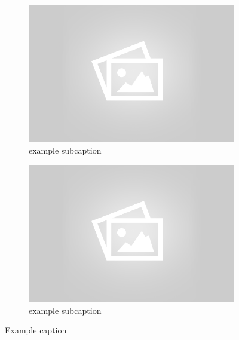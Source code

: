 \begin{itemize}
\begin{figure}[!ht]
\begin{subfigure}[b]{.45\textwidth}
		\includegraphics[width=\textwidth]{mlp/placeholder.png}
		\caption{example subcaption}
		\label{fig:subfigure3}
		\end{subfigure}
		\quad
		\begin{subfigure}[b]{.45\textwidth}
		\centering
		\includegraphics[width=\textwidth]{mlp/placeholder.png}
		\caption{example subcaption}
		\label{fig:subfigure4}
		\end{subfigure}
		\caption{Example caption}
		\label{fig:example}
		\end{figure}


\end{itemize}
